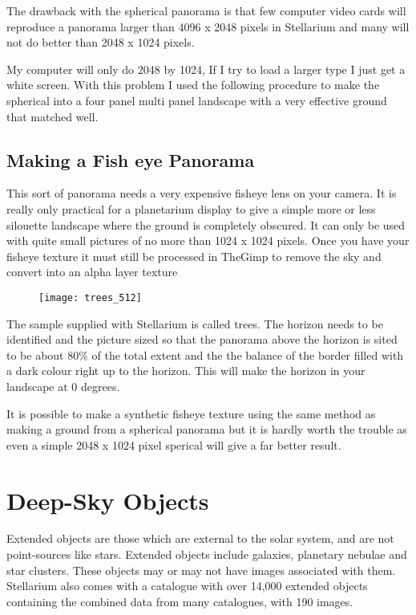 The drawback with the spherical panorama is that few computer video
cards will reproduce a panorama larger than 4096 x 2048 pixels in
Stellarium and many will not do better than 2048 x 1024 pixels.

My computer will only do 2048 by 1024, If I try to load a larger type I
just get a white screen. With this problem I used the following
procedure to make the spherical into a four panel multi panel landscape
with a very effective ground that matched well.

\subsection{Making a Fish eye
Panorama}\label{making-a-fish-eye-panorama}

This sort of panorama needs a very expensive fisheye lens on your
camera. It is really only practical for a planetarium display to give a
simple more or less silouette landscape where the ground is completely
obscured. It can only be used with quite small pictures of no more than
1024 x 1024 pixels. Once you have your fisheye texture it must still be
processed in TheGimp to remove the sky and convert into an alpha layer
texture

\begin{figure}[h]
\centering\texttt{[image: trees\_512]}
\end{figure}

The sample supplied with Stellarium is called trees. The horizon needs
to be identified and the picture sized so that the panorama above the
horizon is sited to be about 80\% of the total extent and the the
balance of the border filled with a dark colour right up to the horizon.
This will make the horizon in your landscape at 0 degrees.

It is possible to make a synthetic fisheye texture using the same method
as making a ground from a spherical panorama but it is hardly worth the
trouble as even a simple 2048 x 1024 pixel sperical will give a far
better result.

\section{Deep-Sky Objects}\label{deep-sky-objects}

Extended objects are those which are external to the solar system, and
are not point-sources like stars. Extended objects include galaxies,
planetary nebulae and star clusters. These objects may or may not have
images associated with them. Stellarium also comes with a catalogue with
over 14,000 extended objects containing the combined data from many
catalogues, with 190 images.


